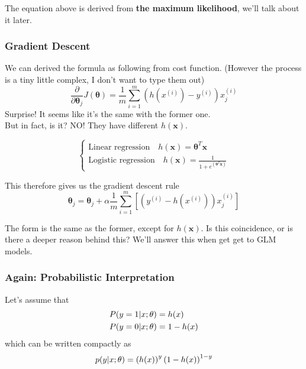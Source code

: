 \documentclass[fontset=windows,pass]{article}
\numberwithin{equation}{subsection} %
\begin{document}
The equation above is derived from \textbf{the maximum likelihood}, we'll talk about it later.

\subsubsection{Gradient Descent}
We can derived the formula as following from cost function. (However the process is a tiny little complex, I don't want to type them out)
\begin{equation*}
	\frac{\partial}{\partial \boldsymbol{\theta}_j} J(\boldsymbol{\theta}) 
	= \frac{1}{m} \sum_{i=1}^{m} \left(h(x^{(i)})-y^{(i)}\right) x^{(i)}_{j}
\end{equation*}
Surprise! It seems like it's the same with the former one.\\
But in fact, is it?
NO! They have different $h(\boldsymbol{x})$.

\begin{equation*}
	\begin{cases}
		\text{Linear regression} \quad h(\boldsymbol{x}) = \boldsymbol{\theta}^{T} \boldsymbol{x}\\
		\text{Logistic regression} \quad h(\boldsymbol{x}) = \frac{1}{1+e^{(\boldsymbol{\theta}^{T} \boldsymbol{x})}}
	\end{cases}
\end{equation*}

This therefore gives us the gradient descent rule
\begin{equation}
	\boldsymbol{\theta}_j = \boldsymbol{\theta}_j + \alpha \frac{1}{m} \sum_{i=1}^{m} \left[\left(y^{(i)} - h(x^{(i)})\right) x^{(i)}_{j}\right]
\end{equation}

The form is the same as the former, except for $h(\boldsymbol{x})$. Is this coincidence, or is there a deeper reason behind this? We'll answer this
when get get to GLM models.

\subsubsection{Again: Probabilistic Interpretation}
Let's assume that
\begin{equation*}
	\begin{aligned}
		P(y = 1 \arrowvert x; \theta) & = h(x)\\
		P(y = 0 \arrowvert x; \theta) & = 1- h(x)
	\end{aligned}
\end{equation*}
which can be written compactly as
\[
	p(y \arrowvert x;\theta) = \left(h(x)\right)^y \left(1-h(x)\right)^{1-y}
\]
\end{document}
